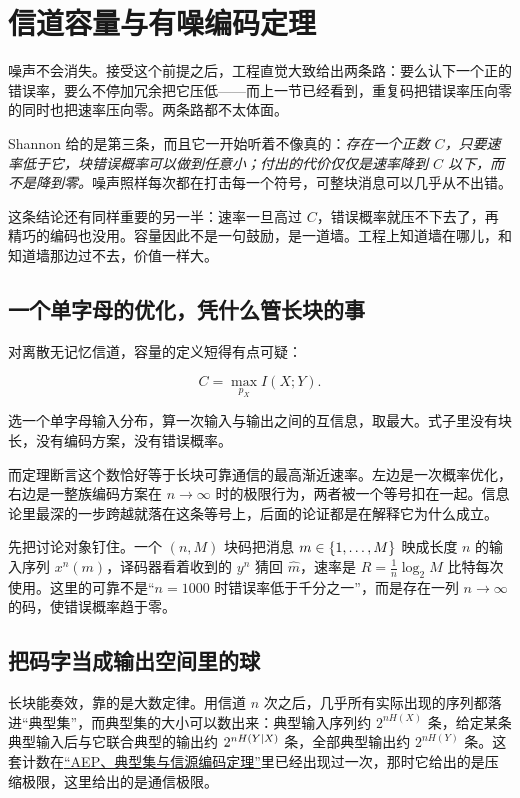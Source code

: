 \section{信道容量与有噪编码定理}
\label{sec:07-Information-Theory/05-Channel-Coding/03}

噪声不会消失。接受这个前提之后，工程直觉大致给出两条路：要么认下一个正的错误率，要么不停加冗余把它压低——而上一节已经看到，重复码把错误率压向零的同时也把速率压向零。两条路都不太体面。

Shannon 给的是第三条，而且它一开始听着不像真的：\emph{存在一个正数 \(C\)，只要速率低于它，块错误概率可以做到任意小；付出的代价仅仅是速率降到 \(C\) 以下，而不是降到零。}噪声照样每次都在打击每一个符号，可整块消息可以几乎从不出错。

这条结论还有同样重要的另一半：速率一旦高过 \(C\)，错误概率就压不下去了，再精巧的编码也没用。容量因此不是一句鼓励，是一道墙。工程上知道墙在哪儿，和知道墙那边过不去，价值一样大。

\subsection{一个单字母的优化，凭什么管长块的事}

对离散无记忆信道，容量的定义短得有点可疑：

\[
C=\max_{p_X}I(X;Y).
\]

选一个单字母输入分布，算一次输入与输出之间的互信息，取最大。式子里没有块长，没有编码方案，没有错误概率。

而定理断言这个数恰好等于长块可靠通信的最高渐近速率。左边是一次概率优化，右边是一整族编码方案在 \(n\to\infty\) 时的极限行为，两者被一个等号扣在一起。信息论里最深的一步跨越就落在这条等号上，后面的论证都是在解释它为什么成立。

先把讨论对象钉住。一个 \((n,M)\) 块码把消息 \(m\in\left\{1,\dots,M\right\}\) 映成长度 \(n\) 的输入序列 \(x^n(m)\)，译码器看着收到的 \(y^n\) 猜回 \(\hat m\)，速率是 \(R=\frac1n\log_2 M\) 比特每次使用。这里的可靠不是``\(n=1000\) 时错误率低于千分之一''，而是存在一列 \(n\to\infty\) 的码，使错误概率趋于零。

\subsection{把码字当成输出空间里的球}

长块能奏效，靠的是大数定律。用信道 \(n\) 次之后，几乎所有实际出现的序列都落进``典型集''，而典型集的大小可以数出来：典型输入序列约 \(2^{nH(X)}\) 条，给定某条典型输入后与它联合典型的输出约 \(2^{nH(Y\mid X)}\) 条，全部典型输出约 \(2^{nH(Y)}\) 条。这套计数在\hyperref[sec:07-Information-Theory/04-Source-Coding/04]{``AEP、典型集与信源编码定理''}里已经出现过一次，那时它给出的是压缩极限，这里给出的是通信极限。

